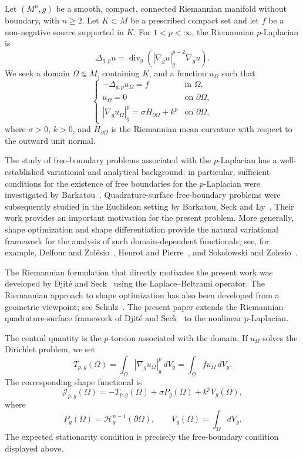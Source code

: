 \documentclass{article}
\begin{document}
Let $(M^n,g)$ be a smooth, compact, connected Riemannian manifold
without boundary, with $n\geq2$. Let $K\subset M$ be a prescribed
compact set and let $f$ be a non-negative source supported in $K$.
For $1<p<\infty$, the Riemannian $p$-Laplacian is
\[
\Delta_{g,p}u
=
\operatorname{div}_g\!\left(
|\nabla_g u|_g^{p-2}\nabla_g u
\right).
\]
We seek a domain $\Omega\Subset M$, containing $K$, and a function
$u_\Omega$ such that
\[
\begin{cases}
-\Delta_{g,p}u_\Omega=f & \text{in }\Omega,\\
u_\Omega=0 & \text{on }\partial\Omega,\\
|\nabla_g u_\Omega|_g^p
=\sigma H_{\partial\Omega}+k^p
& \text{on }\partial\Omega,
\end{cases}
\]
where $\sigma>0$, $k>0$, and $H_{\partial\Omega}$ is the Riemannian
mean curvature with respect to the outward unit normal.

The study of free-boundary problems associated with the $p$-Laplacian
has a well-established variational and analytical background; in
particular, sufficient conditions for the existence of free boundaries
for the $p$-Laplacian were investigated by Barkatou~\cite{Barkatou2002}.
Quadrature-surface free-boundary problems were subsequently studied in
the Euclidean setting by Barkatou, Seck and Ly~\cite{BLS}. Their work
provides an important motivation for the present problem. More generally,
shape optimization and shape differentiation provide the natural
variational framework for the analysis of such domain-dependent
functionals; see, for example, Delfour and Zol\'esio~\cite{DZ},
Henrot and Pierre~\cite{HP}, and Sokolowski and Zolesio~\cite{sozo}.

The Riemannian formulation that directly motivates the present work was
developed by Djit\'e and Seck~\cite{DS3} using the Laplace--Beltrami
operator. The Riemannian approach to shape optimization has also been
developed from a geometric viewpoint; see Schulz~\cite{Schu}. The present
paper extends the Riemannian quadrature-surface framework of
Djit\'e and Seck~\cite{DS3} to the nonlinear $p$-Laplacian.

The central quantity is the $p$-torsion associated with the domain.
If $u_\Omega$ solves the Dirichlet problem, we set
\[
T_{p,g}(\Omega)
=
\int_\Omega |\nabla_g u_\Omega|_g^p\,dV_g
=
\int_\Omega fu_\Omega\,dV_g.
\]
The corresponding shape functional is
\[
\mathcal J_{p,g}(\Omega)
=
-T_{p,g}(\Omega)
+\sigma P_g(\Omega)
+k^pV_g(\Omega),
\]
where
\[
P_g(\Omega)=\mathcal H_g^{n-1}(\partial\Omega),
\qquad
V_g(\Omega)=\int_\Omega dV_g.
\]
The expected stationarity condition is precisely the free-boundary condition displayed above.
\end{document}
